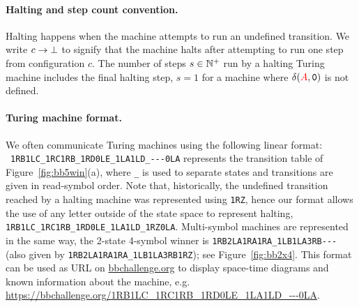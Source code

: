 \paragraph{Halting and step count convention.} Halting happens when the machine attempts to run an undefined transition. We write $c \to \bot$ to signify that the machine halts after attempting to run one step from configuration $c$. The number of steps $s\in \mathbb{N}^+$ run by a halting Turing machine includes the final halting step, \eg $s = 1$ for a machine where $\delta(\stateA,\symbolzero)$ is not defined.



\paragraph*{Turing machine format.} We often communicate Turing machines using the following linear format: \\ \verb|1RB1LC_1RC1RB_1RD0LE_1LA1LD_---0LA| represents the transition table of Figure~\ref{fig:bb5win}(a), where \texttt{\_} is used to separate states and transitions are given in read-symbol order. Note that, historically, the undefined transition reached by a halting machine was represented using \texttt{1RZ}, hence our format allows the use of any letter outside of the state space to represent halting, \eg \texttt{1RB1LC\_1RC1RB\_1RD0LE\_1LA1LD\_1RZ0LA}. Multi-symbol machines are represented in the same way, \eg the 2-state 4-symbol \BBfull winner is \verb|1RB2LA1RA1RA_1LB1LA3RB---| (also given by \texttt{1RB2LA1RA1RA\_1LB1LA3RB1RZ}); see Figure~\ref{fig:bb2x4}. This format can be used as URL on \url{bbchallenge.org} to display space-time diagrams and known information about the machine, e.g. \url{https://bbchallenge.org/1RB1LC\_1RC1RB\_1RD0LE\_1LA1LD\_---0LA}.

